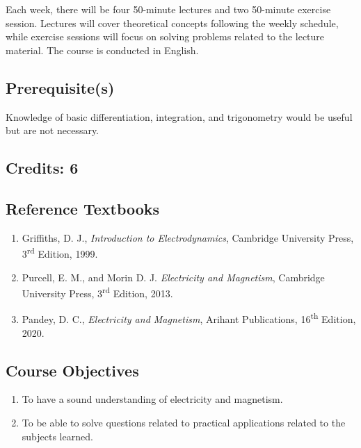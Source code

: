 \documentclass[11pt]{article}
\begin{document}
\vspace{2mm}

Each week, there will be four 50-minute lectures and two 50-minute exercise session. Lectures will cover theoretical concepts following the weekly schedule, while exercise sessions will focus on solving problems related to the lecture material. The course is conducted in English.

\subsection*{Prerequisite(s)} 
Knowledge of basic differentiation, integration, and trigonometry would be useful but are not necessary.

\subsection*{Credits: 6}

\vspace{2mm}

\subsection*{Reference Textbooks} 
\begin{enumerate} \itemsep-0.4em
\item Griffiths, D. J., \emph{Introduction to Electrodynamics}, Cambridge University Press, 3\textsuperscript{rd} Edition, 1999.
\item Purcell, E. M., and Morin D. J. \emph{Electricity and Magnetism}, Cambridge University Press, 3\textsuperscript{rd} Edition, 2013.
\item Pandey, D. C., \emph{Electricity and Magnetism}, Arihant Publications, 16\textsuperscript{th} Edition, 2020.
\end{enumerate}

\subsection*{\large Course Objectives} 
\begin{enumerate} \itemsep-0.4em
  \item To have a sound understanding of electricity and magnetism.
  \item To be able to solve questions related to practical applications related to the subjects learned.
\end{enumerate}

\newpage
\end{document}
